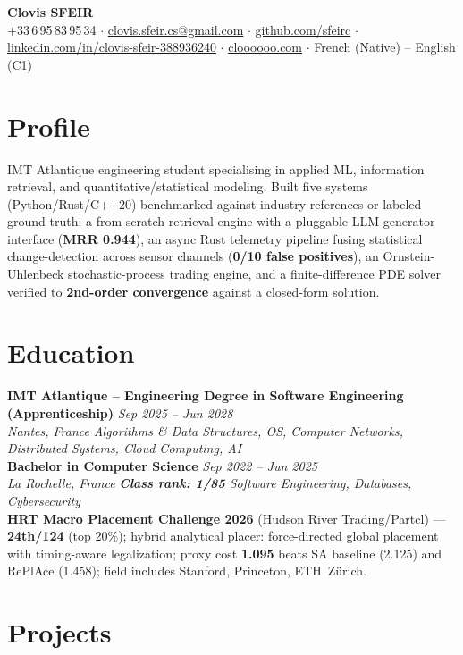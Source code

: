 \documentclass[10pt]{article}
\newcommand{\entry}[4]{%
  \noindent\textbf{#1} \hfill \textit{#2} \\
  \textit{#3} \hfill \textit{#4}\\[-0.3em]
}
\begin{document}
\fontsize{9.3pt}{11pt}\selectfont
\begin{center}
  {\LARGE \textbf{Clovis SFEIR}}\\[0.3em]
  +33\,6\,95\,83\,95\,34 \;$\cdot$\; \href{mailto:clovis.sfeir.cs@gmail.com}{clovis.sfeir.cs@gmail.com} \;$\cdot$\;
  \href{https://github.com/sfeirc}{github.com/sfeirc} \;$\cdot$\;
  \href{https://linkedin.com/in/clovis-sfeir-388936240}{linkedin.com/in/clovis-sfeir-388936240} \;$\cdot$\;
  \href{https://cloooooo.com}{cloooooo.com} \;$\cdot$\; French (Native) -- English (C1)
\end{center}

\section*{Profile}
IMT Atlantique engineering student specialising in applied ML, information retrieval, and quantitative/statistical modeling. Built five systems (Python/Rust/C++20) benchmarked against industry references or labeled ground-truth: a from-scratch retrieval engine with a pluggable LLM generator interface (\textbf{MRR 0.944}), an async Rust telemetry pipeline fusing statistical change-detection across sensor channels (\textbf{0/10 false positives}), an Ornstein-Uhlenbeck stochastic-process trading engine, and a finite-difference PDE solver verified to \textbf{2nd-order convergence} against a closed-form solution.

\section*{Education}
\entry{IMT Atlantique -- Engineering Degree in Software Engineering (Apprenticeship)}{Sep 2025 -- Jun 2028}{Nantes, France}{Algorithms \& Data Structures, OS, Computer Networks, Distributed Systems, Cloud Computing, AI}
\entry{Bachelor in Computer Science}{Sep 2022 -- Jun 2025}{La Rochelle, France}{\textbf{Class rank: 1/85} \textbar{} Software Engineering, Databases, Cybersecurity}
\noindent\textbf{HRT Macro Placement Challenge 2026} (Hudson River Trading/Partcl) --- \textbf{24th/124} (top 20\%); hybrid analytical placer: force-directed global placement with timing-aware legalization; proxy cost \textbf{1.095} beats SA baseline (2.125) and RePlAce (1.458); field includes Stanford, Princeton, ETH~Z\"urich.

\section*{Projects}
\end{document}
